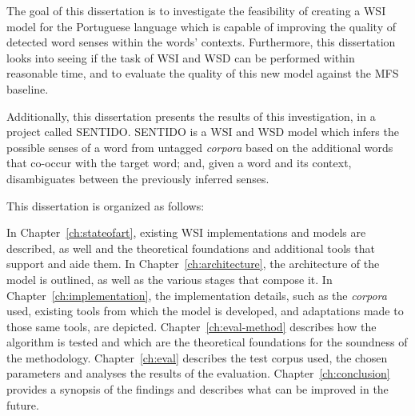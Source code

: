 
The goal of this dissertation is to investigate the feasibility of creating a
\ac{WSI} model for the Portuguese language which is capable of improving the
quality of detected word senses within the words' contexts. Furthermore, this
dissertation looks into seeing if the task of \ac{WSI} and \ac{WSD} can be
performed within reasonable time, and to evaluate the quality of this new model
against the \ac{MFS} baseline.


Additionally, this dissertation presents the results of this investigation, in
a project called \ac{SENTIDO}. \ac{SENTIDO} is a \ac{WSI} and \ac{WSD} model
which infers the possible senses of a word from untagged \emph{corpora} based
on the additional words that co-occur with the target word; and, given a word
and its context, disambiguates between the previously inferred senses.


This dissertation is organized as follows:

In Chapter~\ref{ch:stateofart}, existing \ac{WSI} implementations and models
are described, as well and the theoretical foundations and additional tools
that support and aide them. In Chapter~\ref{ch:architecture}, the architecture
of the model is outlined, as well as the various stages that compose it. In
Chapter~\ref{ch:implementation}, the implementation details, such as the
\emph{corpora} used, existing tools from which the model is developed, and
adaptations made to those same tools, are depicted.
Chapter~\ref{ch:eval-method} describes how the algorithm is tested and which
are the theoretical foundations for the soundness of the methodology.
Chapter~\ref{ch:eval} describes the test corpus used, the chosen parameters and
analyses the results of the evaluation. Chapter~\ref{ch:conclusion} provides a
synopsis of the findings and describes what can be improved in the future.

